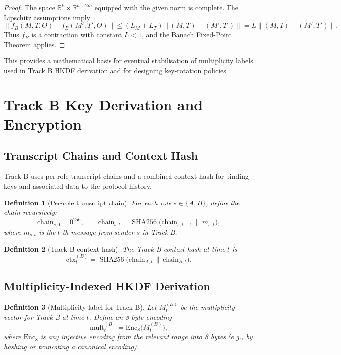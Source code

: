 \documentclass[11pt]{article}
\newtheorem{definition}{Definition}[section]
\newcommand{\R}{\mathbb{R}}
\DeclareMathOperator{\SHA}{SHA256}
\newcommand{\norm}[1]{\left\lVert #1 \right\rVert}
\begin{document}
\begin{proof}
The space \(\R^k \times \R^{n\times 2m}\) equipped with the given norm is complete.
The Lipschitz assumptions imply
\[
  \norm{f_B(M,T,\Theta) - f_B(M',T',\Theta)} \le (L_M + L_T) \norm{(M,T)-(M',T')} = L \norm{(M,T)-(M',T')}.
\]
Thus \(f_B\) is a contraction with constant \(L < 1\), and the Banach Fixed-Point Theorem applies.
\end{proof}

This provides a mathematical basis for eventual stabilisation of multiplicity labels used in Track B HKDF derivation and for designing key-rotation policies.

\section{Track B Key Derivation and Encryption}

\subsection{Transcript Chains and Context Hash}

Track B uses per-role transcript chains and a combined context hash for binding keys and associated data to the protocol history.

\begin{definition}[Per-role transcript chain]
For each role \(s \in \{A,B\}\), define the chain recursively:
\[
  \mathrm{chain}_{s,0} = 0^{256}, \qquad
  \mathrm{chain}_{s,t} = \SHA\bigl(\mathrm{chain}_{s,t-1} \, \| \, m_{s,t}\bigr),
\]
where \(m_{s,t}\) is the \(t\)-th message from sender \(s\) in Track B.
\end{definition}

\begin{definition}[Track B context hash]
The Track B context hash at time \(t\) is
\[
  \mathrm{ctx}_t^{(B)} = \SHA\bigl(\mathrm{chain}_{A,t} \, \| \, \mathrm{chain}_{B,t}\bigr).
\]
\end{definition}

\subsection{Multiplicity-Indexed HKDF Derivation}

\begin{definition}[Multiplicity label for Track B]
Let \(M_t^{(B)}\) be the multiplicity vector for Track B at time \(t\).
Define an 8-byte encoding
\[
  \mathrm{mult}_t^{(B)} = \mathrm{Enc}_8\bigl(M_t^{(B)}\bigr),
\]
where \(\mathrm{Enc}_8\) is any injective encoding from the relevant range into 8 bytes (e.g., by hashing or truncating a canonical encoding).
\end{definition}
\end{document}
